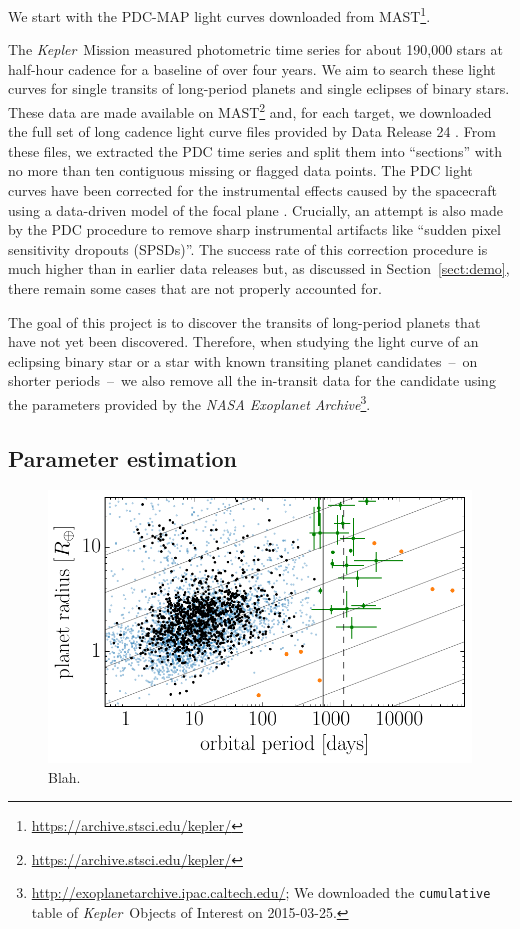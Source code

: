 \documentclass[manuscript, letterpaper]{aastex6}
\newcommand{\project}[1]{\textsl{#1}}
\newcommand{\kepler}{\project{Kepler}}
\newcommand{\figlabel}[1]{\label{fig:#1}}
\newcommand{\sectionname}{Section}
\newcommand{\sectref}[1]{\ref{sect:#1}}
\newcommand{\Sect}[1]{\sectionname~\sectref{#1}}
\newcommand{\sect}[1]{\Sect{#1}}
\begin{document}
We start with the PDC-MAP light curves downloaded from
MAST\footnote{\url{https://archive.stsci.edu/kepler/}}.



The \kepler\ Mission measured photometric time series for about 190,000 stars
at half-hour cadence for a baseline of over four years.
We aim to search these light curves for single transits of long-period planets
and single eclipses of binary stars.
These data are made available on
MAST\footnote{\url{https://archive.stsci.edu/kepler/}} and, for each target,
we downloaded the full set of long cadence light curve files provided by Data
Release 24 \citep{Thompson:2015}.
From these files, we extracted the PDC time series and split them into
``sections'' with no more than ten contiguous missing or flagged data points.
The PDC light curves have been corrected for the instrumental effects caused
by the spacecraft using a data-driven model of the focal plane
\citep{Stumpe:2012, Smith:2012}.
Crucially, an attempt is also made by the PDC procedure to remove sharp
instrumental artifacts like ``sudden pixel sensitivity dropouts (SPSDs)''.
The success rate of this correction procedure is much higher than in earlier
data releases but, as discussed in \sect{demo}, there remain some cases that
are not properly accounted for.

The goal of this project is to discover the transits of long-period planets
that have not yet been discovered.
Therefore, when studying the light curve of an eclipsing binary star or a star
with known transiting planet candidates~--~on shorter periods~--~we also remove
all the in-transit data for the candidate using the parameters provided by the
\project{NASA Exoplanet
Archive}\footnote{\url{http://exoplanetarchive.ipac.caltech.edu/}; We
downloaded the \texttt{cumulative} table of \kepler\ Objects of Interest on
2015-03-25.}.


\subsection{Parameter estimation}


\begin{figure}
\vspace{\baselineskip}
\begin{center}
\includegraphics{figures/full_sample.pdf}
\end{center}
\caption{%
Blah.
\figlabel{full-sample}}
\end{figure}
\end{document}
